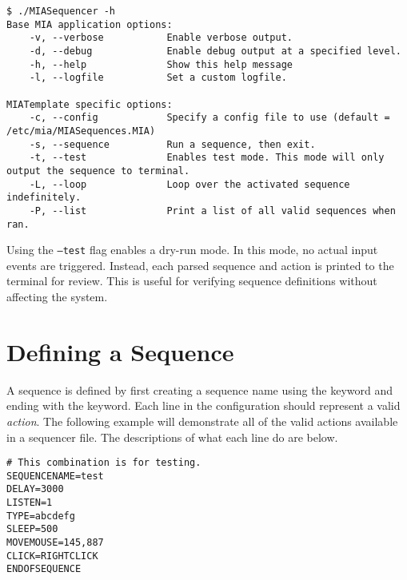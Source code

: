 \begin{lstlisting}[style=terminalstyle]
$ ./MIASequencer -h
Base MIA application options:
	-v, --verbose           Enable verbose output.
	-d, --debug             Enable debug output at a specified level.
	-h, --help              Show this help message
	-l, --logfile           Set a custom logfile.

MIATemplate specific options:
	-c, --config            Specify a config file to use (default = /etc/mia/MIASequences.MIA)
	-s, --sequence          Run a sequence, then exit.
	-t, --test              Enables test mode. This mode will only output the sequence to terminal.
	-L, --loop              Loop over the activated sequence indefinitely.
	-P, --list              Print a list of all valid sequences when ran.
\end{lstlisting}

Using the \texttt{--test} flag enables a dry-run mode. In this mode, no actual input events are triggered. Instead, each parsed sequence and action is printed to the terminal for review. This is useful for verifying sequence definitions without affecting the system.


\section{Defining a Sequence}

A sequence is defined by first creating a sequence name using the  keyword and ending with the  keyword. Each line in the configuration should represent a valid \textit{action}. The following example will demonstrate all of the valid actions available in a sequencer file. The descriptions of what each line do are below.

\begin{lstlisting}[style=pythonstyle]
# This combination is for testing.
SEQUENCENAME=test
DELAY=3000
LISTEN=1
TYPE=abcdefg
SLEEP=500
MOVEMOUSE=145,887
CLICK=RIGHTCLICK
ENDOFSEQUENCE
\end{lstlisting}

